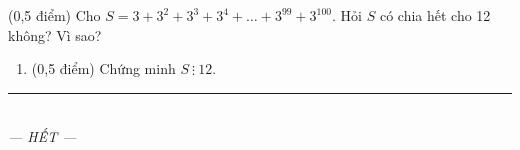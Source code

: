 \documentclass[12pt,a4paper]{article}
\begin{document}
\begin{ex} (0,5 điểm)
Cho $S = 3 + 3^2 + 3^3 + 3^4 + \dots + 3^{99} + 3^{100}$. Hỏi $S$ có chia hết cho 12 không? Vì sao?
\begin{enumerate}[label=\textbf{\alph*)}, leftmargin=0.8cm, itemsep=2pt]
\item (0,5 điểm) Chứng minh $S \ \vdots \ 12$.
\end{enumerate}
\end{ex}
\vspace{1.5mm}


\begin{center}
\rule{4cm}{0.4pt}\\
\textit{--- HẾT ---}
\end{center}
\end{document}
